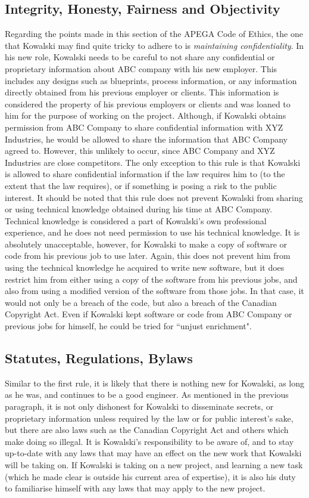 \documentclass[letterpaper,12pt]{article}
\begin{document}
\subsection{Integrity, Honesty, Fairness and Objectivity}
Regarding the points made in this section of the APEGA Code of Ethics, the one that Kowalski may find quite tricky to
adhere to is \textit{maintaining confidentiality}. In his new role, Kowalski needs to be careful to not share
any confidential or proprietary information about ABC company with his new employer. This includes any designs such as blueprints,
process information, or any information directly obtained from his previous employer or clients. 
This information is considered the property of his previous employers or clients and was loaned to him for the purpose of working on the project.
Although, if Kowalski obtains permission from ABC Company to share confidential information with XYZ Industries, he would be allowed to share the information that ABC Company agreed to. 
However, this unlikely to occur, since ABC Company and XYZ Industries are close competitors. The only exception to this rule is that Kowalski is allowed to share confidential information if the law requires him to (to the extent that the law requires), or if something is posing a risk to the public interest. It should be noted that this
rule does not prevent Kowalski from sharing or using technical knowledge obtained during his time at ABC Company. Technical knowledge is considered a part of
Kowalski's own professional experience, and he does not need permission to use his technical knowledge. It is absolutely unacceptable, however, for Kowalski to make a copy of
software or code from his previous job to use later. Again, this does not prevent him from using the technical knowledge he acquired to write new software, 
but it does restrict him from either using a copy of the software from his previous jobs, and also from using a modified version of the software
from those jobs. In that case, it would not only be a breach of the code, but also a breach of the Canadian Copyright Act\cite{copyrightact}.
Even if Kowalski kept software or code from ABC Company or previous jobs for himself, he could be tried for ``unjust enrichment".\cite{apegacode}

\subsection{Statutes, Regulations, Bylaws}
Similar to the first rule, it is likely that there is nothing new for Kowalski, as long as he was, and continues to be a good engineer.
As mentioned in the previous paragraph, it is not only dishonest for Kowalski to disseminate secrets, or proprietary information unless required
by the law or for public interest's sake, but there are also laws such as the Canadian Copyright Act and others which make doing so illegal. It is
Kowalski's responsibility to be aware of, and to stay up-to-date with any laws that may have an effect on the new work that Kowalski will be taking on.
If Kowalski is taking on a new project, and learning a new task (which he made clear is outside his current area of expertise), it is also his duty to
familiarise himself with any laws that may apply to the new project.
\end{document}
